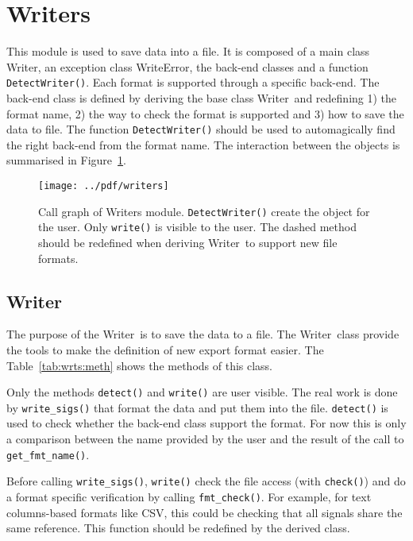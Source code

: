 \documentclass[a4paper,11pt]{article}
\newcommand{\meth}[1]{\texttt{#1()}}
\newcommand{\cls}[1]{\textsf{#1}}
\newcommand{\wrt}{\cls{Writer}}
\newcommand{\wrterr}{\cls{WriteError}}
\begin{document}
\section{Writers}
\label{sec:writers}
This module is used to save data into a file.
It is composed of a main class \wrt, an exception class \wrterr, the back-end classes and a function \meth{DetectWriter}.
Each format is supported through a specific back-end.
The back-end class is defined by deriving the base class \wrt\ and redefining 1) the format name, 2) the way to check the format is supported and 3) how to save the data to file.
The function \meth{DetectWriter} should be used to automagically find the right back-end from the format name.
The interaction between the objects is summarised in Figure~\ref{fig:wrts:callgraph}.

\begin{figure}[htbp]
  \centering
  \texttt{[image: ../pdf/writers]}
  \caption{Call graph of Writers module. \meth{DetectWriter} create the object for the user. Only \meth{write} is visible to the user. The dashed method should be redefined when deriving \wrt\ to support new file formats.}
  \label{fig:wrts:callgraph}
\end{figure}
\subsection{Writer}
The purpose of the \wrt\ is to save the data to a file.
The \wrt\ class provide the tools to make the definition of new export format easier.
The Table~\ref{tab:wrts:meth} shows the methods of this class.

Only the methods \meth{detect} and \meth{write} are user visible.
The real work is done by \meth{write\_sigs} that format the data and put them into the file.
\meth{detect} is used to check whether the back-end class support the format.
For now this is only a comparison between the name provided by the user and the result of the call to \meth{get\_fmt\_name}.

Before calling \meth{write\_sigs}, \meth{write} check the file access (with \meth{check}) and do a format specific verification by calling \meth{fmt\_check}.
For example, for text columns-based formats like CSV, this could be checking that all signals share the same reference.
This function should be redefined by the derived class.
\end{document}
